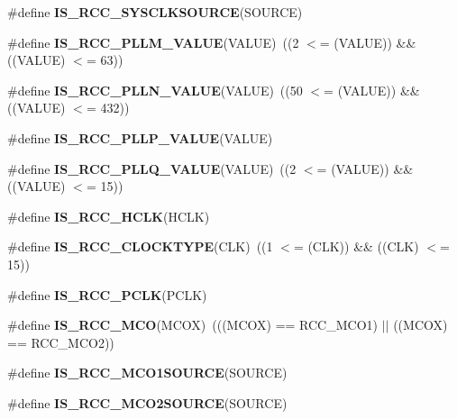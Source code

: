 \begin{DoxyCompactItemize}
\item 
\#define {\bfseries I\+S\+\_\+\+R\+C\+C\+\_\+\+S\+Y\+S\+C\+L\+K\+S\+O\+U\+R\+CE}(S\+O\+U\+R\+CE)
\item 
\mbox{\label{group___r_c_c___i_s___r_c_c___definitions_ga8db327c085e20aeb673a9784f8508597}} 
\#define {\bfseries I\+S\+\_\+\+R\+C\+C\+\_\+\+P\+L\+L\+M\+\_\+\+V\+A\+L\+UE}(V\+A\+L\+UE)~((2 $<$= (V\+A\+L\+UE)) \&\& ((V\+A\+L\+UE) $<$= 63))
\item 
\mbox{\label{group___r_c_c___i_s___r_c_c___definitions_ga12835741fbedd278ad1e91abebe00837}} 
\#define {\bfseries I\+S\+\_\+\+R\+C\+C\+\_\+\+P\+L\+L\+N\+\_\+\+V\+A\+L\+UE}(V\+A\+L\+UE)~((50 $<$= (V\+A\+L\+UE)) \&\& ((V\+A\+L\+UE) $<$= 432))
\item 
\#define {\bfseries I\+S\+\_\+\+R\+C\+C\+\_\+\+P\+L\+L\+P\+\_\+\+V\+A\+L\+UE}(V\+A\+L\+UE)
\item 
\mbox{\label{group___r_c_c___i_s___r_c_c___definitions_gad66dbe75bf8ab2b64b200e796281a851}} 
\#define {\bfseries I\+S\+\_\+\+R\+C\+C\+\_\+\+P\+L\+L\+Q\+\_\+\+V\+A\+L\+UE}(V\+A\+L\+UE)~((2 $<$= (V\+A\+L\+UE)) \&\& ((V\+A\+L\+UE) $<$= 15))
\item 
\#define {\bfseries I\+S\+\_\+\+R\+C\+C\+\_\+\+H\+C\+LK}(H\+C\+LK)
\item 
\mbox{\label{group___r_c_c___i_s___r_c_c___definitions_gaedf7abbab300ed340b88d5f665910707}} 
\#define {\bfseries I\+S\+\_\+\+R\+C\+C\+\_\+\+C\+L\+O\+C\+K\+T\+Y\+PE}(C\+LK)~((1 $<$= (C\+LK)) \&\& ((C\+LK) $<$= 15))
\item 
\#define {\bfseries I\+S\+\_\+\+R\+C\+C\+\_\+\+P\+C\+LK}(P\+C\+LK)
\item 
\mbox{\label{group___r_c_c___i_s___r_c_c___definitions_ga008588e892390391710b57f25ef242bd}} 
\#define {\bfseries I\+S\+\_\+\+R\+C\+C\+\_\+\+M\+CO}(M\+C\+OX)~(((M\+C\+OX) == R\+C\+C\+\_\+\+M\+C\+O1) $\vert$$\vert$ ((M\+C\+OX) == R\+C\+C\+\_\+\+M\+C\+O2))
\item 
\#define {\bfseries I\+S\+\_\+\+R\+C\+C\+\_\+\+M\+C\+O1\+S\+O\+U\+R\+CE}(S\+O\+U\+R\+CE)
\item 
\#define {\bfseries I\+S\+\_\+\+R\+C\+C\+\_\+\+M\+C\+O2\+S\+O\+U\+R\+CE}(S\+O\+U\+R\+CE)
$$
\end{DoxyCompactItemize}
